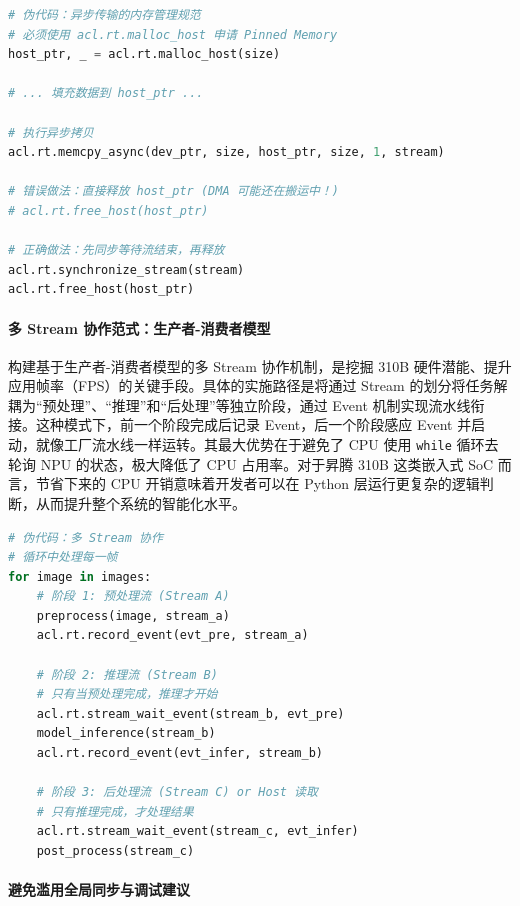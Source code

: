 \begin{lstlisting}[language=Python]
# 伪代码：异步传输的内存管理规范
# 必须使用 acl.rt.malloc_host 申请 Pinned Memory
host_ptr, _ = acl.rt.malloc_host(size) 

# ... 填充数据到 host_ptr ...

# 执行异步拷贝
acl.rt.memcpy_async(dev_ptr, size, host_ptr, size, 1, stream)

# 错误做法：直接释放 host_ptr (DMA 可能还在搬运中！)
# acl.rt.free_host(host_ptr) 

# 正确做法：先同步等待流结束，再释放
acl.rt.synchronize_stream(stream)
acl.rt.free_host(host_ptr)
\end{lstlisting}

\paragraph{多 Stream
协作范式：生产者-消费者模型}\label{src-book-chapter4-h17}

构建基于生产者-消费者模型的多 Stream 协作机制，是挖掘 310B
硬件潜能、提升应用帧率（FPS）的关键手段。具体的实施路径是将通过 Stream
的划分将任务解耦为``预处理''、``推理''和``后处理''等独立阶段，通过 Event
机制实现流水线衔接。这种模式下，前一个阶段完成后记录
Event，后一个阶段感应 Event
并启动，就像工厂流水线一样运转。其最大优势在于避免了 CPU 使用
\passthrough{\lstinline!while!} 循环去轮询 NPU 的状态，极大降低了 CPU
占用率。对于昇腾 310B 这类嵌入式 SoC 而言，节省下来的 CPU
开销意味着开发者可以在 Python
层运行更复杂的逻辑判断，从而提升整个系统的智能化水平。

\begin{lstlisting}[language=Python]
# 伪代码：多 Stream 协作
# 循环中处理每一帧
for image in images:
    # 阶段 1: 预处理流 (Stream A)
    preprocess(image, stream_a)
    acl.rt.record_event(evt_pre, stream_a)
    
    # 阶段 2: 推理流 (Stream B)
    # 只有当预处理完成，推理才开始
    acl.rt.stream_wait_event(stream_b, evt_pre) 
    model_inference(stream_b)
    acl.rt.record_event(evt_infer, stream_b)
    
    # 阶段 3: 后处理流 (Stream C) or Host 读取
    # 只有推理完成，才处理结果
    acl.rt.stream_wait_event(stream_c, evt_infer)
    post_process(stream_c)
\end{lstlisting}

\paragraph{避免滥用全局同步与调试建议}\label{src-book-chapter4-h18}

